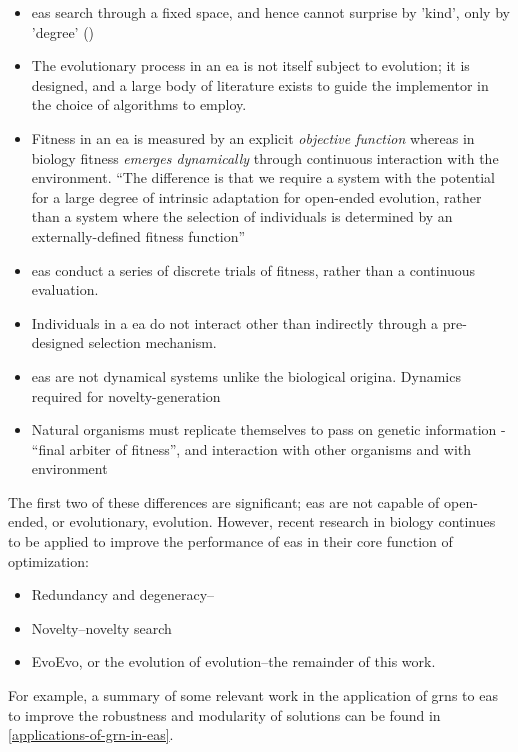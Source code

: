 \begin{itemize}
\item \Glspl{ea} search through a fixed space, and hence cannot surprise by 'kind', only by 'degree' (\eg \parencite{Nellis2014})
\item The evolutionary process in an \gls{ea} is not itself subject to evolution; it is designed, and a large body of literature exists to guide the implementor in the choice of algorithms to employ.
\item Fitness in an \gls{ea} is measured by an explicit \emph{objective function} whereas in biology fitness \emph{emerges dynamically} through continuous interaction with the environment. ``The difference is that we require a system with the potential for a large degree of intrinsic adaptation for open-ended evolution, rather than a system where the selection of individuals is determined by an externally-defined fitness function'' \parencite{Taylor2001}
\item \Glspl{ea} conduct a series of discrete trials of fitness, rather than a continuous evaluation.
\item Individuals in a \gls{ea} do not interact other than indirectly through a pre-designed selection mechanism.
\item \Glspl{ea} are not dynamical systems unlike the biological origina. Dynamics required for novelty-generation \parencite{Nellis2012}
\item Natural organisms must replicate themselves to pass on genetic information - ``final arbiter of fitness'', and interaction with other organisms and with environment \parencite{Ofria2004}
\end{itemize}

The first two of these differences are significant; \glspl{ea} are not capable of open-ended, or evolutionary, evolution. However, recent research in biology continues to be applied to improve the performance of \glspl{ea} in their core function of optimization:
\begin{itemize}
	\item Redundancy and degeneracy--\eg \parencite{Whitacre:2010qy}
	\item Novelty--\eg novelty search \parencite{Lehman:2008cr}
	\item EvoEvo, or the evolution of evolution--\eg the remainder of this work.
\end{itemize}

For example, a summary of some relevant work in the application of \glspl{grn} to \glspl{ea} to improve the robustness and modularity of solutions can be found in \ref{applications-of-grn-in-eas}.

